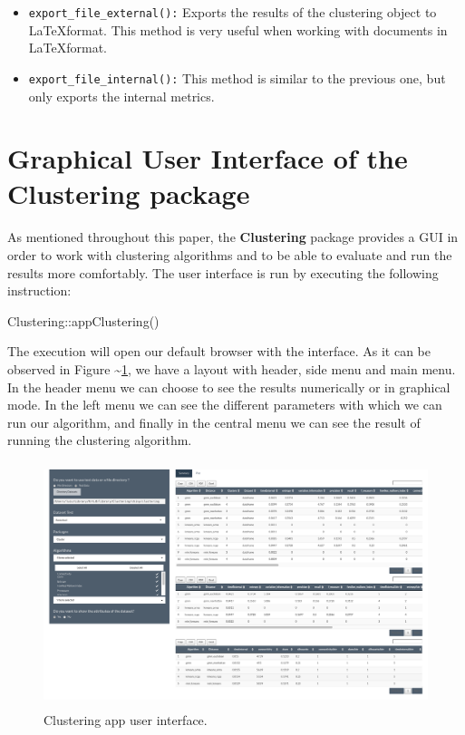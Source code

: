 \documentclass[
]{article}
\newenvironment{Shaded}{\begin{snugshade}}{\end{snugshade}}
\newcommand{\FunctionTok}[1]{\textcolor[rgb]{0.00,0.00,0.00}{#1}}
\newcommand{\NormalTok}[1]{#1}
\newcommand{\SpecialCharTok}[1]{\textcolor[rgb]{0.00,0.00,0.00}{#1}}
\providecommand{\tightlist}{%
  \setlength{\itemsep}{0pt}\setlength{\parskip}{0pt}}
\begin{document}
\begin{itemize}
\tightlist
\item
  \texttt{export\_file\_external():} Exports the results of the
  clustering object to \LaTeX format. This method is very useful when
  working with documents in \LaTeX format.
\item
  \texttt{export\_file\_internal():} This method is similar to the
  previous one, but only exports the internal metrics.
\end{itemize}

\hypertarget{graphical-user-interface-of-the-clustering-package}{%
\section{\texorpdfstring{Graphical User Interface of the
\textbf{Clustering}
package}{Graphical User Interface of the Clustering package}}\label{graphical-user-interface-of-the-clustering-package}}

As mentioned throughout this paper, the \textbf{Clustering} package
provides a GUI in order to work with clustering algorithms and to be
able to evaluate and run the results more comfortably. The user
interface is run by executing the following instruction:

\begin{Shaded}
\begin{Highlighting}[]
\NormalTok{Clustering}\SpecialCharTok{::}\FunctionTok{appClustering}\NormalTok{()}
\end{Highlighting}
\end{Shaded}

The execution will open our default browser with the interface. As it
can be observed in Figure \textasciitilde{}\ref{layoutApp}, we have a
layout with header, side menu and main menu. In the header menu we can
choose to see the results numerically or in graphical mode. In the left
menu we can see the different parameters with which we can run our
algorithm, and finally in the central menu we can see the result of
running the clustering algorithm.

\begin{figure}
\centering
\includegraphics[width=\textwidth,height=2.8125in]{img/app}
\caption{Clustering app user interface. \label{layoutApp}}
\end{figure}
\end{document}

